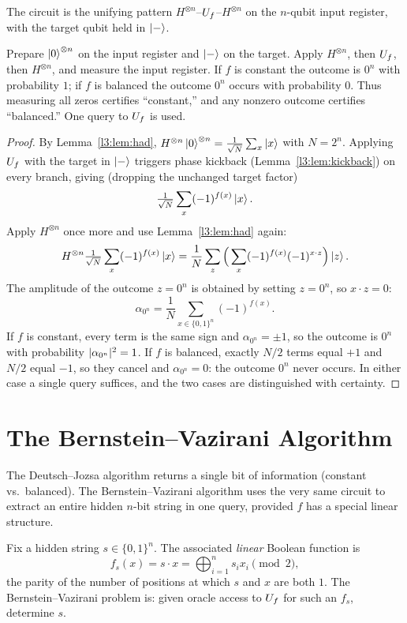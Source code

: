 The circuit is the unifying pattern $H^{\otimes n}$--$U_f$--$H^{\otimes n}$ on the
$n$-qubit input register, with the target qubit held in $\ket{-}$.

\begin{theorem}
\label{l3:thm:dj}
Prepare $\ket{0}^{\otimes n}$ on the input register and $\ket{-}$ on the target.
Apply $H^{\otimes n}$, then $U_f$, then $H^{\otimes n}$, and measure the input
register. If $f$ is constant the outcome is $0^n$ with probability $1$; if $f$ is
balanced the outcome $0^n$ occurs with probability $0$. Thus measuring all zeros
certifies ``constant,'' and any nonzero outcome certifies ``balanced.'' One query
to $U_f$ is used.
\end{theorem}

\begin{proof}
By Lemma~\ref{l3:lem:had}, $H^{\otimes n}\ket{0}^{\otimes n}
=\tfrac{1}{\sqrt N}\sum_{x}\ket{x}$ with $N=2^n$. Applying $U_f$ with the target
in $\ket{-}$ triggers phase kickback (Lemma~\ref{l3:lem:kickback}) on every branch,
giving (dropping the unchanged target factor)
\[
  \tfrac{1}{\sqrt N}\sum_{x}(-1)^{f(x)}\ket{x}.
\]
Apply $H^{\otimes n}$ once more and use Lemma~\ref{l3:lem:had} again:
\[
  H^{\otimes n}\tfrac{1}{\sqrt N}\sum_{x}(-1)^{f(x)}\ket{x}
  =\frac{1}{N}\sum_{z}\Big(\sum_{x}(-1)^{f(x)}(-1)^{x\cdot z}\Big)\ket{z}.
\]
The amplitude of the outcome $z=0^n$ is obtained by setting $z=0^n$, so $x\cdot z=0$:
\[
  \alpha_{0^n}=\frac{1}{N}\sum_{x\in\{0,1\}^n}(-1)^{f(x)}.
\]
If $f$ is constant, every term is the same sign and $\alpha_{0^n}=\pm1$, so the
outcome is $0^n$ with probability $\lvert\alpha_{0^n}\rvert^2=1$. If $f$ is balanced,
exactly $N/2$ terms equal $+1$ and $N/2$ equal $-1$, so they cancel and
$\alpha_{0^n}=0$: the outcome $0^n$ never occurs. In either case a single query
suffices, and the two cases are distinguished with certainty.
\end{proof}

\section{The Bernstein--Vazirani Algorithm}

The Deutsch--Jozsa algorithm returns a single bit of information (constant vs.\
balanced). The Bernstein--Vazirani algorithm uses the very same circuit to extract
an entire hidden $n$-bit string in one query, provided $f$ has a special linear
structure.

\begin{definition}
\label{l3:def:bv}
Fix a hidden string $s\in\{0,1\}^n$. The associated \emph{linear} Boolean function is
\[
  f_s(x)=s\cdot x=\bigoplus_{i=1}^{n}s_i x_i \pmod 2,
\]
the parity of the number of positions at which $s$ and $x$ are both $1$. The
Bernstein--Vazirani problem is: given oracle access to $U_f$ for such an $f_s$,
determine $s$.
\end{definition}

